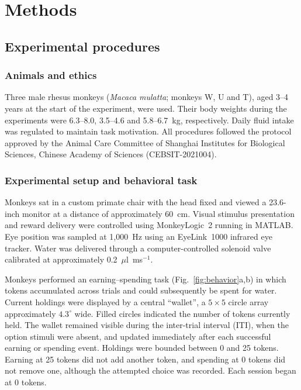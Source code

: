 \documentclass[pdflatex,sn-mathphys-num]{sn-jnl}%
\begin{document}
\section{Methods}\label{sec4}

\subsection{Experimental procedures}

\subsubsection{Animals and ethics}
Three male rhesus monkeys (\textit{Macaca mulatta}; monkeys W, U and T), aged 3--4 years at the start of the experiment, were used. Their body weights during the experiments were 6.3--8.0, 3.5--4.6 and 5.8--6.7~kg, respectively. Daily fluid intake was regulated to maintain task motivation. All procedures followed the protocol approved by the Animal Care Committee of Shanghai Institutes for Biological Sciences, Chinese Academy of Sciences (CEBSIT-2021004).

\subsubsection{Experimental setup and behavioral task}\label{sec:m_task}
Monkeys sat in a custom primate chair with the head fixed and viewed a 23.6-inch monitor at a distance of approximately 60~cm. Visual stimulus presentation and reward delivery were controlled using MonkeyLogic~2 running in MATLAB. Eye position was sampled at 1,000~Hz using an EyeLink~1000 infrared eye tracker. Water was delivered through a computer-controlled solenoid valve calibrated at approximately 0.2~$\mu$l~ms$^{-1}$.

Monkeys performed an earning--spending task (Fig.~\ref{fig:behavior}a,b) in which tokens accumulated across trials and could subsequently be spent for water. Current holdings were displayed by a central ``wallet'', a $5\times5$ circle array approximately $4.3^\circ$ wide. Filled circles indicated the number of tokens currently held. The wallet remained visible during the inter-trial interval (ITI), when the option stimuli were absent, and updated immediately after each successful earning or spending event. Holdings were bounded between 0 and 25 tokens. Earning at 25 tokens did not add another token, and spending at 0 tokens did not remove one, although the attempted choice was recorded. Each session began at 0 tokens.
\end{document}
